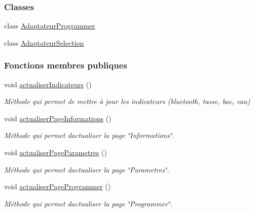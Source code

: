 \subsubsection*{Classes}
\begin{DoxyCompactItemize}
\item 
class \hyperlink{classcom_1_1example_1_1ekawa_1_1_ihm_1_1_adaptateur_programmer}{Adaptateur\+Programmer}
\item 
class \hyperlink{classcom_1_1example_1_1ekawa_1_1_ihm_1_1_adaptateur_selection}{Adaptateur\+Selection}
\end{DoxyCompactItemize}
\subsubsection*{Fonctions membres publiques}
\begin{DoxyCompactItemize}
\item 
void \hyperlink{classcom_1_1example_1_1ekawa_1_1_ihm_a2c3740dd5be20b3111b36649514fd41e}{actualiser\+Indicateurs} ()
\begin{DoxyCompactList}\small\item\em Méthode qui permet de mettre à jour les indicateurs (bluetooth, tasse, bac, eau) \end{DoxyCompactList}\item 
void \hyperlink{classcom_1_1example_1_1ekawa_1_1_ihm_a2422719a8e893b23e95f80b5899adb76}{actualiser\+Page\+Informations} ()
\begin{DoxyCompactList}\small\item\em Méthode qui permet d\textquotesingle{}actualiser la page \char`\"{}\+Informations\char`\"{}. \end{DoxyCompactList}\item 
void \hyperlink{classcom_1_1example_1_1ekawa_1_1_ihm_a7eca80c1cbf9a0f0f5c82dd79d32f4f4}{actualiser\+Page\+Parametres} ()
\begin{DoxyCompactList}\small\item\em Méthode qui permet d\textquotesingle{}actualiser la page \char`\"{}\+Parametres\char`\"{}. \end{DoxyCompactList}\item 
void \hyperlink{classcom_1_1example_1_1ekawa_1_1_ihm_adbeeac61b5a53c52d21da490659de983}{actualiser\+Page\+Programmer} ()
\begin{DoxyCompactList}\small\item\em Méthode qui permet d\textquotesingle{}actualiser la page \char`\"{}\+Programmer\char`\"{}. \end{DoxyCompactList}\item 

\end{DoxyCompactItemize}
